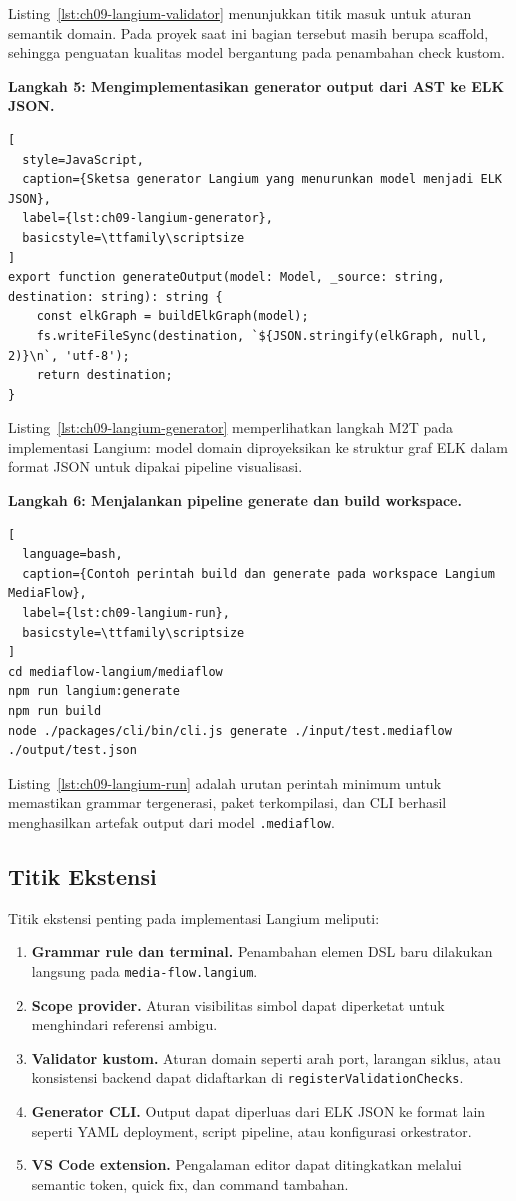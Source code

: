 \noindent Listing~\ref{lst:ch09-langium-validator} menunjukkan titik masuk untuk aturan semantik domain. Pada proyek saat ini bagian tersebut masih berupa scaffold, sehingga penguatan kualitas model bergantung pada penambahan check kustom.

\textbf{Langkah 5: Mengimplementasikan generator output dari AST ke ELK JSON.}
\begin{lstlisting}[
  style=JavaScript,
  caption={Sketsa generator Langium yang menurunkan model menjadi ELK JSON},
  label={lst:ch09-langium-generator},
  basicstyle=\ttfamily\scriptsize
]
export function generateOutput(model: Model, _source: string, destination: string): string {
    const elkGraph = buildElkGraph(model);
    fs.writeFileSync(destination, `${JSON.stringify(elkGraph, null, 2)}\n`, 'utf-8');
    return destination;
}
\end{lstlisting}

\noindent Listing~\ref{lst:ch09-langium-generator} memperlihatkan langkah M2T pada implementasi Langium: model domain diproyeksikan ke struktur graf ELK dalam format JSON untuk dipakai pipeline visualisasi.

\textbf{Langkah 6: Menjalankan pipeline generate dan build workspace.}
\begin{lstlisting}[
  language=bash,
  caption={Contoh perintah build dan generate pada workspace Langium MediaFlow},
  label={lst:ch09-langium-run},
  basicstyle=\ttfamily\scriptsize
]
cd mediaflow-langium/mediaflow
npm run langium:generate
npm run build
node ./packages/cli/bin/cli.js generate ./input/test.mediaflow ./output/test.json
\end{lstlisting}

\noindent Listing~\ref{lst:ch09-langium-run} adalah urutan perintah minimum untuk memastikan grammar tergenerasi, paket terkompilasi, dan CLI berhasil menghasilkan artefak output dari model \texttt{.mediaflow}.

\subsection{Titik Ekstensi}

Titik ekstensi penting pada implementasi Langium meliputi:
\begin{enumerate}
  \item \textbf{Grammar rule dan terminal.} Penambahan elemen DSL baru dilakukan langsung pada \texttt{media-flow.langium}.
  \item \textbf{Scope provider.} Aturan visibilitas simbol dapat diperketat untuk menghindari referensi ambigu.
  \item \textbf{Validator kustom.} Aturan domain seperti arah port, larangan siklus, atau konsistensi backend dapat didaftarkan di \texttt{registerValidationChecks}.
  \item \textbf{Generator CLI.} Output dapat diperluas dari ELK JSON ke format lain seperti YAML deployment, script pipeline, atau konfigurasi orkestrator.
  \item \textbf{VS Code extension.} Pengalaman editor dapat ditingkatkan melalui semantic token, quick fix, dan command tambahan.
\end{enumerate}

